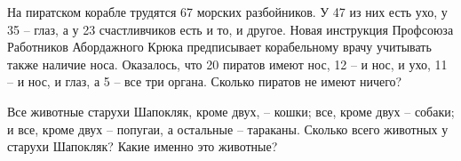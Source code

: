 \begin{thm}
На пиратском корабле трудятся 67 морских разбойников. У 47 из них есть ухо, у 35 – глаз, а у 23 счастливчиков есть и то, и другое. Новая инструкция Профсоюза Работников Абордажного Крюка предписывает корабельному врачу учитывать также наличие носа. Оказалось, что 20 пиратов имеют нос, 12 – и нос, и ухо, 11 – и нос, и глаз, а 5 – все три органа. Сколько пиратов не имеют ничего?
\end{thm}

\begin{thm}
Все животные старухи Шапокляк, кроме двух, – кошки; все, кроме двух – собаки; и все, кроме двух – попугаи, а остальные – тараканы. Сколько всего животных у старухи Шапокляк? Какие именно это животные?
\end{thm}